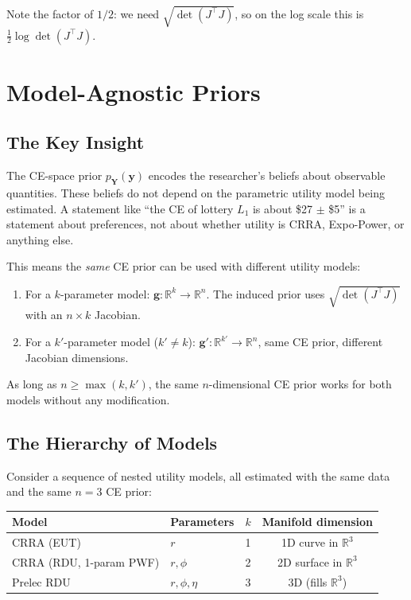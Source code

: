 \documentclass[11pt,a4paper]{article}
\theoremstyle{definition}
\begin{document}
Note the factor of $1/2$: we need $\sqrt{\det(J^\top J)}$, so on the log
scale this is $\frac{1}{2} \log \det(J^\top J)$.


\section{Model-Agnostic Priors}
\label{sec:model_agnostic}

\subsection{The Key Insight}

The CE-space prior $p_{\mathbf{Y}}(\mathbf{y})$ encodes the researcher's
beliefs about observable quantities. These beliefs do not depend on the
parametric utility model being estimated. A statement like ``the CE of lottery
$L_1$ is about \$27 $\pm$ \$5'' is a statement about preferences, not about
whether utility is CRRA, Expo-Power, or anything else.

This means the \emph{same} CE prior can be used with different utility
models:
\begin{enumerate}
    \item For a $k$-parameter model: $\mathbf{g}: \mathbb{R}^k \to
    \mathbb{R}^n$. The induced prior uses $\sqrt{\det(J^\top J)}$ with an
    $n \times k$ Jacobian.
    \item For a $k'$-parameter model ($k' \neq k$):
    $\mathbf{g}': \mathbb{R}^{k'} \to \mathbb{R}^n$, same CE prior, different
    Jacobian dimensions.
\end{enumerate}

As long as $n \geq \max(k, k')$, the same $n$-dimensional CE prior works for
both models without any modification.

\subsection{The Hierarchy of Models}

Consider a sequence of nested utility models, all estimated with the same
data and the same $n = 3$ CE prior:

\begin{center}
\begin{tabular}{llcc}
\toprule
Model & Parameters & $k$ & Manifold dimension \\
\midrule
CRRA (EUT) & $r$ & 1 & 1D curve in $\mathbb{R}^3$ \\
CRRA (RDU, 1-param PWF) & $r, \phi$ & 2 & 2D surface in $\mathbb{R}^3$ \\
Prelec RDU & $r, \phi, \eta$ & 3 & 3D (fills $\mathbb{R}^3$) \\
\bottomrule
\end{tabular}
\end{center}
\end{document}
